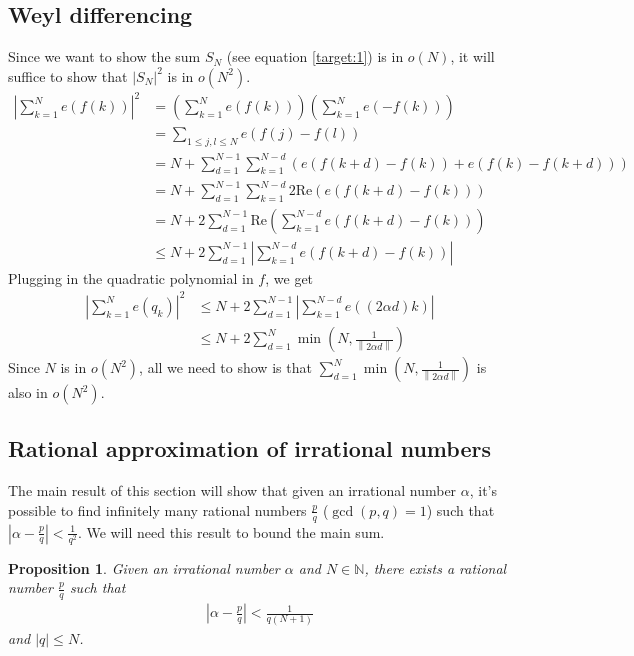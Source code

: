 \documentclass[12pt]{article}
\newtheorem{prop}[thm]{Proposition}
\theoremstyle{definition}
\newcommand{\norm}[1]{\left\lVert#1\right\rVert}
\renewcommand{\Re}{\mathrm{Re}}
\begin{document}
\subsection{Weyl differencing} \label{sect:1}
Since we want to show the sum $S_N$ (see equation \ref{target:1}) is in $o(N)$, it will suffice to show that $\left| S_N \right|^2$ is in $o(N^2)$.
\begin{align*}
    \left| \sum_{k=1}^{N} e(f(k)) \right|^2 &= \left( \sum_{k=1}^{N} e(f(k)) \right) \left( \sum_{k=1}^{N} e(-f(k)) \right) \\
    &= \sum_{1 \leq j,l \leq N} e(f(j) - f(l)) \\
    &= N + \sum_{d=1}^{N-1} \sum_{k=1}^{N-d} \left( e(f(k+d) - f(k)) + e(f(k) - f(k+d)) \right) \\
    &= N + \sum_{d=1}^{N-1} \sum_{k=1}^{N-d} 2\Re \left( e(f(k+d) - f(k)) \right) \\
    &= N + 2 \sum_{d=1}^{N-1} \Re \left( \sum_{k=1}^{N-d} e(f(k+d) - f(k)) \right) \\
    &\leq N + 2 \sum_{d=1}^{N-1} \left| \sum_{k=1}^{N-d} e(f(k+d) - f(k)) \right|
\end{align*}
Plugging in the quadratic polynomial in $f$, we get
\begin{align*}
    \left| \sum_{k=1}^{N} e(q_k) \right|^2 &\leq N + 2\sum_{d=1}^{N-1} \left| \sum_{k=1}^{N-d} e((2\alpha d)k) \right| \\
    &\leq N + 2 \sum_{d=1}^{N} \min \left( N, \frac{1}{\norm{2\alpha d}} \right)
\end{align*}
Since $N$ is in $o(N^2)$, all we need to show is that $\displaystyle \sum_{d=1}^{N} \min\left( N, \frac{1}{\norm{2\alpha d}} \right)$ is also in $o(N^2)$.

\subsection{Rational approximation of irrational numbers}
The main result of this section will show that given an irrational number $\alpha$, it's possible to find infinitely many rational numbers $\frac{p}{q}$ ($\gcd(p,q) = 1$) such that $|\alpha - \frac{p}{q}| < \frac{1}{q^2}$. We will need this result to bound the main sum.

\begin{prop} \label{prop:1}
    Given an irrational number $\alpha$ and $N \in \mathbb{N}$, there exists a rational number $\frac{p}{q}$ such that
    \begin{align*}
        \left| \alpha - \frac{p}{q} \right| < \frac{1}{q(N+1)}
    \end{align*}
    and $|q| \leq N$.
\end{prop}
\end{document}
